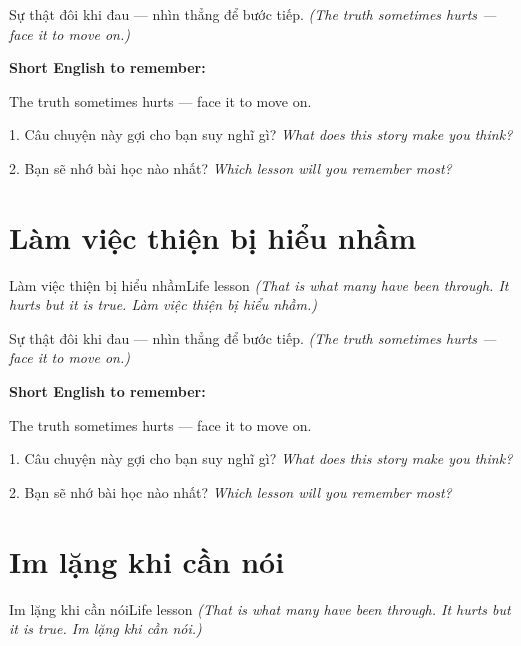 \begin{baihoc}
Sự thật đôi khi đau — nhìn thẳng để bước tiếp.
\textit{(The truth sometimes hurts — face it to move on.)}
\end{baihoc}

\begin{ghinhoanh}
\textbf{Short English to remember:}

The truth sometimes hurts — face it to move on.

\end{ghinhoanh}

\begin{tuhocnhanh}
1. Câu chuyện này gợi cho bạn suy nghĩ gì? \textit{What does this story make you think?}

2. Bạn sẽ nhớ bài học nào nhất? \textit{Which lesson will you remember most?}
\end{tuhocnhanh}
\ngancach


\section{Làm việc thiện bị hiểu nhầm}
\begin{truyen}{Làm việc thiện bị hiểu nhầm}{Life lesson}
\textit{(That is what many have been through. It hurts but it is true. Làm việc thiện bị hiểu nhầm.)}
\end{truyen}

\begin{baihoc}
Sự thật đôi khi đau — nhìn thẳng để bước tiếp.
\textit{(The truth sometimes hurts — face it to move on.)}
\end{baihoc}

\begin{ghinhoanh}
\textbf{Short English to remember:}

The truth sometimes hurts — face it to move on.

\end{ghinhoanh}

\begin{tuhocnhanh}
1. Câu chuyện này gợi cho bạn suy nghĩ gì? \textit{What does this story make you think?}

2. Bạn sẽ nhớ bài học nào nhất? \textit{Which lesson will you remember most?}
\end{tuhocnhanh}
\ngancach


\section{Im lặng khi cần nói}
\begin{truyen}{Im lặng khi cần nói}{Life lesson}
\textit{(That is what many have been through. It hurts but it is true. Im lặng khi cần nói.)}
\end{truyen}

